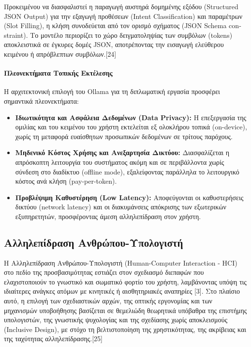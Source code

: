 \documentclass[twoside, a4paper, 11pt]{article}
\newcommand{\textlatin}[1]{\textenglish{#1}}
\begin{document}
Προκειμένου να διασφαλιστεί η παραγωγή αυστηρά δομημένης εξόδου (\textlatin{Structured JSON Output}) για την εξαγωγή προθέσεων (\textlatin{Intent Classification}) και παραμέτρων (\textlatin{Slot Filling}), η κλήση συνοδεύεται από τον ορισμό σχήματος (\textlatin{JSON Schema constraint}). Το μοντέλο περιορίζει το χώρο δειγματοληψίας των συμβόλων (\textlatin{tokens}) αποκλειστικά σε έγκυρες δομές \textlatin{JSON}, αποτρέποντας την εισαγωγή ελεύθερου κειμένου ή απρόβλεπτων συμβόλων.[24]

\paragraph{Πλεονεκτήματα Τοπικής Εκτέλεσης}
Η αρχιτεκτονική επιλογή του \textlatin{Ollama} για τη διπλωματική εργασία προσφέρει σημαντικά πλεονεκτήματα:
\begin{itemize}
    \item \textbf{Ιδιωτικότητα και Ασφάλεια Δεδομένων (\textlatin{Data Privacy}):} Η επεξεργασία της ομιλίας και του κειμένου του χρήστη εκτελείται εξ ολοκλήρου τοπικά (\textlatin{on-device}), χωρίς τη μεταφορά ευαίσθητων προσωπικών δεδομένων σε τρίτους παρόχους.
    \item \textbf{Μηδενικό Κόστος Χρήσης και Ανεξαρτησία Δικτύου:} Διασφαλίζεται η απρόσκοπτη λειτουργία του συστήματος ακόμη και σε περιβάλλοντα χωρίς σύνδεση στο διαδίκτυο (\textlatin{offline mode}), εξαλείφοντας παράλληλα το λειτουργικό κόστος ανά κλήση (\textlatin{pay-per-token}).
    \item \textbf{Προβλέψιμη Καθυστέρηση (\textlatin{Low Latency}):} Αποφεύγονται οι καθυστερήσεις δικτύου (\textlatin{network latency}) και οι διακυμάνσεις απόκρισης των εξωτερικών εξυπηρετητών, προσφέροντας άμεση αλληλεπίδραση στον χρήστη.
\end{itemize}

\subsection{Αλληλεπίδραση Ανθρώπου-Υπολογιστή}
Η Αλληλεπίδραση Ανθρώπου-Υπολογιστή (\textlatin{Human-Computer Interaction - HCI}) στο πεδίο της προσβασιμότητας εστιάζει στον σχεδιασμό διεπαφών που ελαχιστοποιούν το γνωστικό και σωματικό φορτίο του χρήστη, 
λαμβάνοντας υπόψη τις ιδιαίτερες ανάγκες ατόμων με κινητικές ή αισθητηριακές αναπηρίες [3]. Στο πλαίσιο αυτό, η επιλογή των σχεδιαστικών αρχών, της οπτικής εργονομίας και των μηχανισμών υποβοήθησης βασίζεται
σε θεμελιώδη θεωρητικά υπόβαθρα της επιστήμης υπολογιστών, της γνωστικής ψυχολογίας και της σχεδίασης χωρίς αποκλεισμούς (\textlatin{Inclusive Design}), με στόχο τη βελτιστοποίηση της χρηστικότητας, της ακρίβειας και της ταχύτητας αλληλεπίδρασης.[25]
\end{document}
